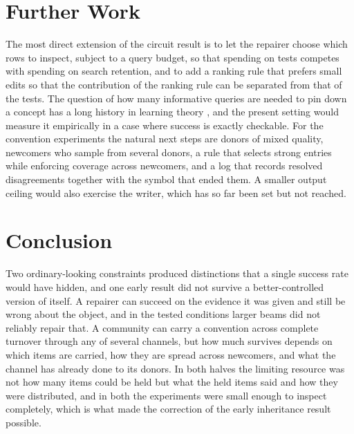 \documentclass[11pt]{article}
\begin{document}
\section{Further Work}

The most direct extension of the circuit result is to let the repairer choose which rows to inspect, subject to a query budget, so that spending on tests competes with spending on search retention, and to add a ranking rule that prefers small edits so that the contribution of the ranking rule can be separated from that of the tests. The question of how many informative queries are needed to pin down a concept has a long history in learning theory \cite{angluin1988queries}, and the present setting would measure it empirically in a case where success is exactly checkable. For the convention experiments the natural next steps are donors of mixed quality, newcomers who sample from several donors, a rule that selects strong entries while enforcing coverage across newcomers, and a log that records resolved disagreements together with the symbol that ended them. A smaller output ceiling would also exercise the writer, which has so far been set but not reached.

\section{Conclusion}

Two ordinary-looking constraints produced distinctions that a single success rate would have hidden, and one early result did not survive a better-controlled version of itself. A repairer can succeed on the evidence it was given and still be wrong about the object, and in the tested conditions larger beams did not reliably repair that. A community can carry a convention across complete turnover through any of several channels, but how much survives depends on which items are carried, how they are spread across newcomers, and what the channel has already done to its donors. In both halves the limiting resource was not how many items could be held but what the held items said and how they were distributed, and in both the experiments were small enough to inspect completely, which is what made the correction of the early inheritance result possible.
\end{document}
